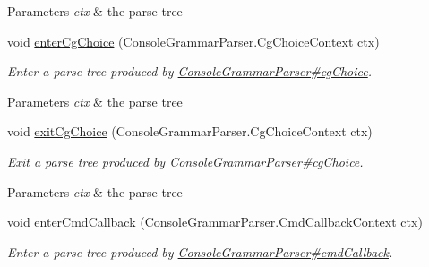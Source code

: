 \begin{DoxyCompactItemize}
\begin{DoxyCompactList}
\begin{DoxyParams}{Parameters}
{\em ctx} & the parse tree\\
\hline
\end{DoxyParams}
 \end{DoxyCompactList}\item 
void \hyperlink{classgov_1_1nasa_1_1jpf_1_1inspector_1_1client_1_1parser_1_1_console_grammar_base_listener_a5aa6c83de5cadff0ebcc6a7cd25a47d2}{enter\+Cg\+Choice} (Console\+Grammar\+Parser.\+Cg\+Choice\+Context ctx)
\begin{DoxyCompactList}\small\item\em Enter a parse tree produced by \hyperlink{classgov_1_1nasa_1_1jpf_1_1inspector_1_1client_1_1parser_1_1_console_grammar_parser_ae9e68f2464be6f44c270bac7de701f69}{Console\+Grammar\+Parser\#cg\+Choice}.


\begin{DoxyParams}{Parameters}
{\em ctx} & the parse tree\\
\hline
\end{DoxyParams}
 \end{DoxyCompactList}\item 
void \hyperlink{classgov_1_1nasa_1_1jpf_1_1inspector_1_1client_1_1parser_1_1_console_grammar_base_listener_a280e7f9972db2c7571c1a2c2f895e178}{exit\+Cg\+Choice} (Console\+Grammar\+Parser.\+Cg\+Choice\+Context ctx)
\begin{DoxyCompactList}\small\item\em Exit a parse tree produced by \hyperlink{classgov_1_1nasa_1_1jpf_1_1inspector_1_1client_1_1parser_1_1_console_grammar_parser_ae9e68f2464be6f44c270bac7de701f69}{Console\+Grammar\+Parser\#cg\+Choice}.


\begin{DoxyParams}{Parameters}
{\em ctx} & the parse tree\\
\hline
\end{DoxyParams}
 \end{DoxyCompactList}\item 
void \hyperlink{classgov_1_1nasa_1_1jpf_1_1inspector_1_1client_1_1parser_1_1_console_grammar_base_listener_a3e4634f46c26f55c5ec8713d0c6be058}{enter\+Cmd\+Callback} (Console\+Grammar\+Parser.\+Cmd\+Callback\+Context ctx)
\begin{DoxyCompactList}\small\item\em Enter a parse tree produced by \hyperlink{classgov_1_1nasa_1_1jpf_1_1inspector_1_1client_1_1parser_1_1_console_grammar_parser_af893e7316098e4d23ed6419676687461}{Console\+Grammar\+Parser\#cmd\+Callback}.



\end{DoxyCompactList}
\end{DoxyCompactItemize}
